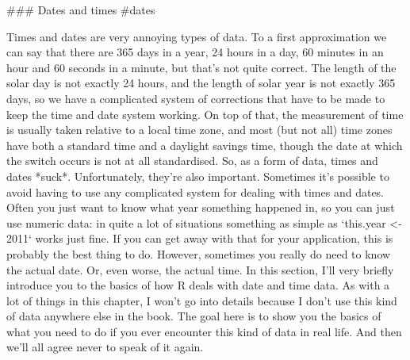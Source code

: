 ### Dates and times {#dates}

Times and dates are very annoying types of data. To a first approximation we can say that there are 365 days in a year, 24 hours in a day, 60 minutes in an hour and 60 seconds in a minute, but that's not quite correct. The length of the solar day is not exactly 24 hours, and the length of solar year is not exactly 365 days, so we have a complicated system of corrections that have to be made to keep the time and date system working. On top of that, the measurement of time is usually taken relative to a local time zone, and most (but not all) time zones have both a standard time and a daylight savings time, though the date at which the switch occurs is not at all standardised. So, as a form of data, times and dates *suck*. Unfortunately, they're also important. Sometimes it's possible to avoid having to use any complicated system for dealing with times and dates. Often you just want to know what year something happened in, so you can just use numeric data: in quite a lot of situations something as simple as `this.year <- 2011` works just fine. If you can get away with that for your application, this is probably the best thing to do. However, sometimes you really do need to know the actual date. Or, even worse, the actual time. In this section, I'll very briefly introduce you to the basics of how R deals with date and time data. As with a lot of things in this chapter, I won't go into details because I don't use this kind of data anywhere else in the book. The goal here is to show you the basics of what you need to do if you ever encounter this kind of data in real life. And then we'll all agree never to speak of it again.

